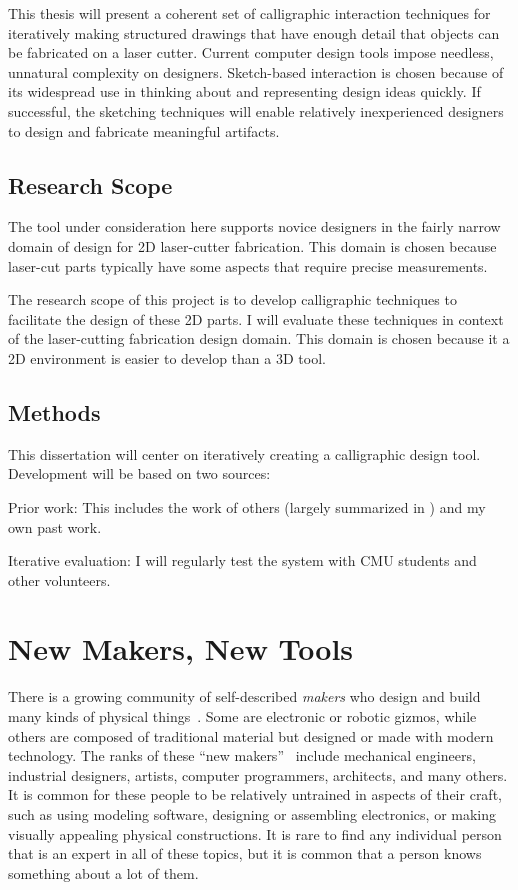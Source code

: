 \documentclass[11pt]{article}
\newenvironment{packed_enum}{
\begin{enumerate}
  \setlength{\itemsep}{1pt}
  \setlength{\parskip}{0pt}
  \setlength{\parsep}{0pt}
}{\end{enumerate}}
\begin{document}
This thesis will present a coherent set of calligraphic interaction
techniques for iteratively making structured drawings that have enough
detail that objects can be fabricated on a laser cutter. Current
computer design tools impose needless, unnatural complexity on
designers. Sketch-based interaction is chosen because of its
widespread use in thinking about and representing design ideas
quickly. If successful, the sketching techniques will enable
relatively inexperienced designers to design and fabricate meaningful
artifacts.

\subsection{Research Scope}

The tool under consideration here supports novice designers in the
fairly narrow domain of design for 2D laser-cutter fabrication. This
domain is chosen because laser-cut parts typically have some aspects
that require precise measurements. 

The research scope of this project is to develop calligraphic
techniques to facilitate the design of these 2D parts. I will evaluate
these techniques in context of the laser-cutting fabrication design
domain. This domain is chosen because it a 2D environment is easier to
develop than a 3D tool.

\subsection{Methods}

This dissertation will center on iteratively creating a calligraphic
design tool. Development will be based on two sources:

\begin{packed_enum}
\item Prior work: This includes the work of others (largely summarized
  in \cite{johnson-sketch-review}) and my own past work.
\item Iterative evaluation: I will regularly test the system with CMU
  students and other volunteers. 
\end{packed_enum}

\section{New Makers, New Tools}

There is a growing community of self-described \textit{makers} who
design and build many kinds of physical
things~\cite{gershenfeld-fab}. Some are electronic or robotic gizmos,
while others are composed of traditional material but designed or made
with modern technology. The ranks of these ``new
makers''~\cite{gross-new-makers} include mechanical engineers,
industrial designers, artists, computer programmers, architects, and
many others. It is common for these people to be relatively untrained
in aspects of their craft, such as using modeling software, designing
or assembling electronics, or making visually appealing physical
constructions. It is rare to find any individual person that is an
expert in all of these topics, but it is common that a person knows
something about a lot of them.
\end{document}
